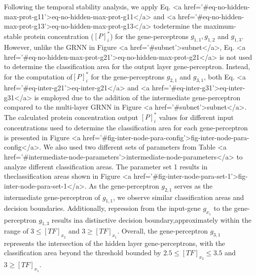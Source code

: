 \documentclass[twocolumn]{biophys-new}
\begin{document}
{{Following the temporal stability analysis, we apply Eq. <a href='#eq-no-hidden-max-prot-g11'>eq-no-hidden-max-prot-g11</a> and <a href='#eq-no-hidden-max-prot-g13'>eq-no-hidden-max-prot-g13</a> todetermine the maximum-stable protein concentration ($[P]^*_i$) for the gene-perceptrons $g_{1,1}, g_{1,2}$ and $g_{1,3}$. 
However, unlike the GRNN in Figure <a href='#subnet'>subnet</a>, Eq. <a href='#eq-no-hidden-max-prot-g21'>eq-no-hidden-max-prot-g21</a> is not used to determine the classification area for the output layer gene-perceptron. 
Instead, for the computation of$[P]^*_i$ for the gene-perceptrons $g_{2,1}$ and $g_{3,1}$, both Eq. <a href='#eq-inter-g21'>eq-inter-g21</a> and <a href='#eq-inter-g31'>eq-inter-g31</a> is employed due to the addition of the intermediate gene-perceptron compared to the multi-layer GRNN in Figure <a href='#subnet'>subnet</a>. The calculated protein concentration output $[P]^*_i$ values for different input concentrations used to determine the classification area for each gene-perceptron is presented in Figure <a href='#fig-inter-node-para-config'>fig-inter-node-para-config</a>. 
We also used two different sets of parameters from Table <a href='#intermediate-node-parameters'>intermediate-node-parameters</a> to analyze different classification areas.
The parameter set 1 results in theclassification areas shown in Figure <a href='#fig-inter-node-para-set-1'>fig-inter-node-para-set-1</a>. As the gene-perceptron $g_{2,1}$ serves as the intermediate gene-perceptron of $g_{1,1}$, we observe similar classification areas and decision boundaries.
Additionally, repression from the input-gene $g_{x_1}$ to the gene-perceptron $g_{1,3}$ results ina distinctive decision boundary,approximately within the range of $3 \leq [TF]_{x_2}$ and $3 \geq [TF]_{x_1}$. Overall, the gene-perceptron $g_{3,1}$ represents the intersection of the hidden layer gene-perceptrons, with the classification area beyond the threshold bounded by $2.5 \leq [TF]_{x_2} \leq 3.5$ and $3 \geq [TF]_{x_1}$. 

}}
\end{document}
